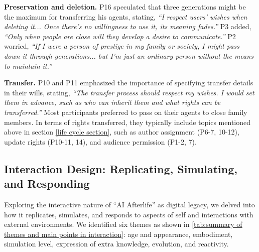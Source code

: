 \textbf{Preservation and deletion.}
 P16 speculated that three generations might be the maximum for transferring his agents, stating, \textit{``I respect users' wishes when deleting it... Once there's no willingness to use it, its meaning fades.''} P3 added, \textit{``Only when people are close will they develop a desire to communicate.''} 
 P2 worried, \textit{``If I were a person of prestige in my family or society, I might pass down it through generations... but I'm just an ordinary person without the means to maintain it.''} 

\textbf{Transfer.}
 P10 and P11 emphasized the importance of specifying transfer details in their wills, stating, \textit{``The transfer process should respect my wishes. I would set them in advance, such as who can inherit them and what rights can be transferred.''} 
Most participants preferred to pass on their agents to close family members. In terms of rights transferred, they typically include topics mentioned above in section \ref{life cycle section}, such as author assignment (P6-7, 10-12), update rights (P10-11, 14), and audience permission (P1-2, 7). 


\subsection{Interaction Design: Replicating, Simulating, and Responding}
\label{sec: interaction design}
Exploring the interactive nature of ``AI Afterlife'' as digital legacy, we delved into how it replicates, simulates, and responds to aspects of self and interactions with external environments. We identified six themes as shown in \autoref{tab:summary of themes and main points in interaction}: age and appearance, embodiment, simulation level, expression of extra knowledge, evolution, and reactivity.

